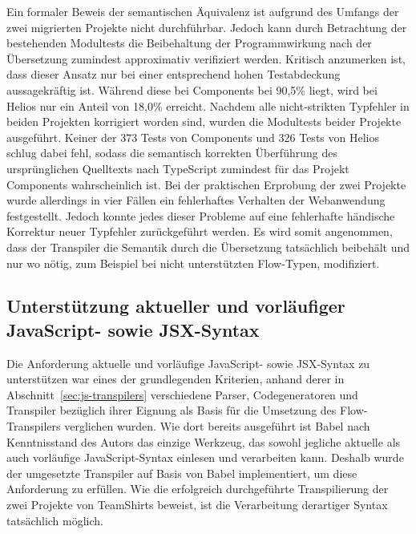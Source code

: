 Ein formaler Beweis der semantischen Äquivalenz ist aufgrund des Umfangs der zwei migrierten Projekte nicht durchführbar. Jedoch kann durch Betrachtung der bestehenden Modultests die Beibehaltung der Programmwirkung nach der Übersetzung zumindest approximativ verifiziert werden. Kritisch anzumerken ist, dass dieser Ansatz nur bei einer entsprechend hohen Testabdeckung aussagekräftig ist. Während diese bei Components bei 90,5\% liegt, wird bei Helios nur ein Anteil von 18,0\% erreicht.
Nachdem alle nicht-strikten Typfehler in beiden Projekten korrigiert worden sind, wurden die Modultests beider Projekte ausgeführt. Keiner der 373 Tests von Components und 326 Tests von Helios schlug dabei fehl, sodass die semantisch korrekten Überführung des ursprünglichen Quelltexts nach TypeScript zumindest für das Projekt Components wahrscheinlich ist. Bei der praktischen Erprobung der zwei Projekte wurde allerdings in vier Fällen ein fehlerhaftes Verhalten der Webanwendung festgestellt. Jedoch konnte jedes dieser Probleme auf eine fehlerhafte händische Korrektur neuer Typfehler zurückgeführt werden. Es wird somit angenommen, dass der Transpiler die Semantik durch die Übersetzung tatsächlich beibehält und nur wo nötig, zum Beispiel bei nicht unterstützten Flow-Typen, modifiziert.

\subsection{Unterstützung aktueller und vorläufiger JavaScript- sowie JSX-Syntax}

Die Anforderung aktuelle und vorläufige JavaScript- sowie JSX-Syntax zu unterstützen war eines der grundlegenden Kriterien, anhand derer in Abschnitt~\ref{sec:js-transpilers} verschiedene Parser, Codegeneratoren und Transpiler bezüglich ihrer Eignung als Basis für die Umsetzung des Flow-Transpilers verglichen wurden. Wie dort bereits ausgeführt ist Babel nach Kenntnisstand des Autors das einzige Werkzeug, das sowohl jegliche aktuelle als auch vorläufige JavaScript-Syntax einlesen und verarbeiten kann. Deshalb wurde der umgesetzte Transpiler auf Basis von Babel implementiert, um diese Anforderung zu erfüllen. Wie die erfolgreich durchgeführte Transpilierung der zwei Projekte von TeamShirts beweist, ist die Verarbeitung derartiger Syntax tatsächlich möglich.

